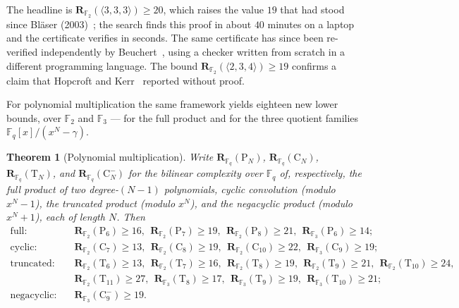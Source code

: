 \documentclass[11pt]{article}
\newtheorem{theorem}{Theorem}
\theoremstyle{definition}
\newcommand{\F}{\mathbb{F}}
\newcommand{\Rk}[2]{\mathbf{R}_{#1}(#2)}
\newcommand{\Cyct}[1]{\mathrm{C}_{#1}}
\newcommand{\Fullt}[1]{\mathrm{P}_{#1}}
\newcommand{\Trunct}[1]{\mathrm{T}_{#1}}
\newcommand{\Negat}[1]{\mathrm{C}^{-}_{#1}}
\newcommand{\mmt}[3]{\langle #1,#2,#3\rangle}
\begin{document}
The headline is $\Rk{\F_2}{\mmt{3}{3}{3}}\ge 20$, which raises the value $19$ that had
stood since Bl\"aser (2003)~\cite{blaser2003complexity}; the search finds this proof
in about $40$ minutes on a laptop and the certificate verifies in seconds. The same
certificate has since been re-verified independently by
Beuchert~\cite{beuchert_2026_20752782}, using a checker written from scratch in a
different programming language. The bound
$\Rk{\F_2}{\mmt{2}{3}{4}}\ge 19$ confirms a claim that Hopcroft and
Kerr~\cite{hopcroft1971minimizing} reported without proof.

For polynomial multiplication the same framework yields eighteen new lower bounds,
over $\F_2$ and $\F_3$ --- for the full product and for the
three quotient families $\F_q[x]/(x^N-\gamma)$.

\begin{theorem}[Polynomial multiplication]\label{thm:poly}
  Write $\Rk{\F_q}{\Fullt{N}}$, $\Rk{\F_q}{\Cyct{N}}$, $\Rk{\F_q}{\Trunct{N}}$, and
  $\Rk{\F_q}{\Negat{N}}$ for the bilinear complexity over $\F_q$ of, respectively, the
  full product of two degree-$(N-1)$ polynomials, cyclic convolution (modulo $x^N-1$),
  the truncated product (modulo $x^N$), and the negacyclic product (modulo $x^N+1$),
  each of length $N$. Then
  \[
    \begin{aligned}
      \text{full:}       & \quad \Rk{\F_2}{\Fullt{6}}\ge 16,\ \ \Rk{\F_2}{\Fullt{7}}\ge 19,\ \ \Rk{\F_2}{\Fullt{8}}\ge 21,\ \ \Rk{\F_3}{\Fullt{6}}\ge 14;                                      \\
      \text{cyclic:}     & \quad \Rk{\F_2}{\Cyct{7}}\ge 13,\ \ \Rk{\F_2}{\Cyct{8}}\ge 19,\ \ \Rk{\F_2}{\Cyct{10}}\ge 22,\ \ \Rk{\F_3}{\Cyct{9}}\ge 19;                                         \\
      \text{truncated:}  & \quad \Rk{\F_2}{\Trunct{6}}\ge 13,\ \ \Rk{\F_2}{\Trunct{7}}\ge 16,\ \ \Rk{\F_2}{\Trunct{8}}\ge 19,\ \ \Rk{\F_2}{\Trunct{9}}\ge 21,\ \ \Rk{\F_2}{\Trunct{10}}\ge 24, \\
      & \quad \Rk{\F_2}{\Trunct{11}}\ge 27,\ \ \Rk{\F_3}{\Trunct{8}}\ge 17,\ \ \Rk{\F_3}{\Trunct{9}}\ge 19,\ \ \Rk{\F_3}{\Trunct{10}}\ge 21;                                \\
      \text{negacyclic:} & \quad \Rk{\F_3}{\Negat{9}}\ge 19.
    \end{aligned}
  \]
\end{theorem}
\end{document}

